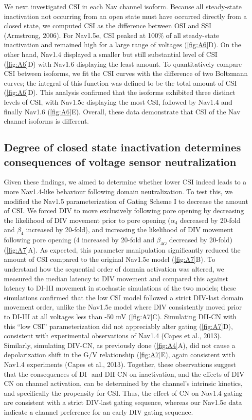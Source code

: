 We next investigated CSI in each Nav channel isoform. Because all steady-state inactivation not occurring from an open state must have occurred directly from a closed state, we computed CSI as the difference between OSI and SSI (Armstrong, 2006). For Nav1.5e, CSI peaked at 100\% of all steady-state inactivation and remained high for a large range of voltages (\autoref{fig:A6}D). On the other hand, Nav1.4 displayed a smaller but still substantial level of CSI (\autoref{fig:A6}D) with Nav1.6 displaying the least amount. To quantitatively compare CSI between isoforms, we fit the CSI curves with the difference of two Boltzmann curves; the integral of this function was defined to be the total amount of CSI (\autoref{fig:A6}D). This analysis confirmed that the isoforms exhibited three distinct levels of CSI, with Nav1.5e displaying the most CSI, followed by Nav1.4 and finally Nav1.6 (\autoref{fig:A6}E). Overall, these data demonstrate that CSI of the Nav channel isoforms is different.

\subsection{Degree of closed state inactivation determines consequences of voltage sensor neutralization}
Given these findings, we aimed to determine whether lower CSI indeed leads to a more Nav1.4-like behaviour following domain neutralization. To test this, we modified the Nav1.5 parameterization of Gating Scheme I to decrease the amount of CSI. We forced DIV to move exclusively following pore opening by decreasing the likelihood of DIV movement prior to pore opening ($\alpha_4$ decreased by 20-fold and $\beta_4$ increased by 20-fold), and increasing the likelihood of DIV movement following pore opening (4 increased by 20-fold and $\beta_{4O}$ decreased by 20-fold) (\autoref{fig:A7}A). As expected, this parameter manipulation significantly reduced the amount of CSI compared to the original Nav1.5e model (\autoref{fig:A7}B). To understand how the sequential order of domain activation was altered, we measured the median latency to DIV movement and compared this against latency to DI-III movement in stochastic simulations of the two models; these simulations confirmed that the low CSI model followed a strict DIV-last domain movement order, unlike the Nav1.5e model where DIV consistently moved prior to DI-III at all voltages less than -50 mV (\autoref{fig:A7}C).
Simulating DII-CN with this “low CSI” parameterization did not appreciably alter gating (\autoref{fig:A7}D), consistent with experimental observations of Nav1.4 (Capes et al., 2013). Similarly, simulating DIV-CN, as previously done (\autoref{fig:A4}A), did not cause a depolarization shift in the G/V relationship (\autoref{fig:A7}E), again consistent with Nav1.4 experiments (Capes et al., 2013). Together, these observations suggest that the consequences of DI- and DII-CN on inactivation, and the effects of DIV-CN on channel activation, can be determined by the channel’s intrinsic kinetics, and specifically the propensity for CSI. Thus, the effect of CN on Nav1.4 gating are consistent with a strict DIV-last gating sequence, whereas our Nav1.5e data indicate a channel preference for an early DIV gating sequence.

